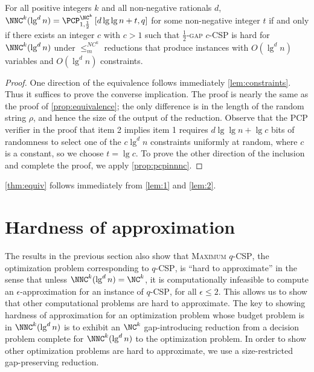 \documentclass[]{article}
\newcommand{\PCPcs}[5]{\PCP^{#1}_{#2, #3}\left[#4, #5\right]}
\begin{document}
\begin{lemma}\label{lem:2}
  For all positive integers $k$ and all non-negative rationals $d$, $\NNC^k(\lg^d n) = \PCPcs{\NC^k}{1}{\frac{1}{2}}{d \lg \lg n + t}{q}$ for some non-negative integer $t$ if and only if there exists an integer $c$ with $c > 1$ such that \textsc{$\frac{1}{2}$-gap $c$-CSP} is hard for $\NNC^k(\lg^d n)$ under $\leq_m^{NC^k}$ reductions that produce instances with $O(\lg^d n)$ variables and $O(\lg^d n)$ constraints.
\end{lemma}
\begin{proof}
  One direction of the equivalence follows immediately \autoref{lem:constraints}.
  Thus it suffices to prove the converse implication.
  The proof is nearly the same as the proof of \autoref{prop:equivalence}; the only difference is in the length of the random string $\rho$, and hence the size of the output of the reduction.
  Observe that the PCP verifier in the proof that item 2 implies item 1 requires $d \lg \lg n + \lg c$ bits of randomness to select one of the $c \lg^d n$ constraints uniformly at random, where $c$ is a constant, so we choose $t = \lg c$.
  To prove the other direction of the inclusion and complete the proof, we apply \autoref{prop:pcpinnnc}.
\end{proof}

\autoref{thm:equiv} follows immediately from \autoref{lem:1} and \autoref{lem:2}.

\section{Hardness of approximation}

The results in the previous section also show that \textsc{Maximum $q$-CSP}, the optimization problem corresponding to \textsc{$q$-CSP}, is ``hard to approximate'' in the sense that unless $\NNC^k(\lg^d n) = \NC^k$, it is computationally infeasible to compute an $\epsilon$-approximation for an instance of \textsc{$q$-CSP}, for all $\epsilon \leq 2$.
This allows us to show that other computational problems are hard to approximate.
The key to showing hardness of approximation for an optimization problem whose budget problem is in $\NNC^k(\lg^d n)$ is to exhibit an $\NC^k$ gap-introducing reduction from a decision problem complete for $\NNC^k(\lg^d n)$ to the optimization problem.
In order to show other optimization problems are hard to approximate, we use a size-restricted gap-preserving reduction.
\end{document}
